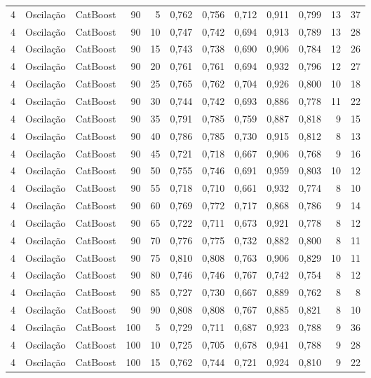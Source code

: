 \begin{longtable}{@{}rllrrrrrrrrr@{}}
4 & Oscilação & CatBoost & 90 & 5 & 0,762 & 0,756 & 0,712 & 0,911 & 0,799 & 13 & 37 \\
4 & Oscilação & CatBoost & 90 & 10 & 0,747 & 0,742 & 0,694 & 0,913 & 0,789 & 13 & 28 \\
4 & Oscilação & CatBoost & 90 & 15 & 0,743 & 0,738 & 0,690 & 0,906 & 0,784 & 12 & 26 \\
4 & Oscilação & CatBoost & 90 & 20 & 0,761 & 0,761 & 0,694 & 0,932 & 0,796 & 12 & 27 \\
4 & Oscilação & CatBoost & 90 & 25 & 0,765 & 0,762 & 0,704 & 0,926 & 0,800 & 10 & 18 \\
4 & Oscilação & CatBoost & 90 & 30 & 0,744 & 0,742 & 0,693 & 0,886 & 0,778 & 11 & 22 \\
4 & Oscilação & CatBoost & 90 & 35 & 0,791 & 0,785 & 0,759 & 0,887 & 0,818 & 9 & 15 \\
4 & Oscilação & CatBoost & 90 & 40 & 0,786 & 0,785 & 0,730 & 0,915 & 0,812 & 8 & 13 \\
4 & Oscilação & CatBoost & 90 & 45 & 0,721 & 0,718 & 0,667 & 0,906 & 0,768 & 9 & 16 \\
4 & Oscilação & CatBoost & 90 & 50 & 0,755 & 0,746 & 0,691 & 0,959 & 0,803 & 10 & 12 \\
4 & Oscilação & CatBoost & 90 & 55 & 0,718 & 0,710 & 0,661 & 0,932 & 0,774 & 8 & 10 \\
4 & Oscilação & CatBoost & 90 & 60 & 0,769 & 0,772 & 0,717 & 0,868 & 0,786 & 9 & 14 \\
4 & Oscilação & CatBoost & 90 & 65 & 0,722 & 0,711 & 0,673 & 0,921 & 0,778 & 8 & 12 \\
4 & Oscilação & CatBoost & 90 & 70 & 0,776 & 0,775 & 0,732 & 0,882 & 0,800 & 8 & 11 \\
4 & Oscilação & CatBoost & 90 & 75 & 0,810 & 0,808 & 0,763 & 0,906 & 0,829 & 10 & 11 \\
4 & Oscilação & CatBoost & 90 & 80 & 0,746 & 0,746 & 0,767 & 0,742 & 0,754 & 8 & 12 \\
4 & Oscilação & CatBoost & 90 & 85 & 0,727 & 0,730 & 0,667 & 0,889 & 0,762 & 8 & 8 \\
4 & Oscilação & CatBoost & 90 & 90 & 0,808 & 0,808 & 0,767 & 0,885 & 0,821 & 8 & 10 \\
4 & Oscilação & CatBoost & 100 & 5 & 0,729 & 0,711 & 0,687 & 0,923 & 0,788 & 9 & 36 \\
4 & Oscilação & CatBoost & 100 & 10 & 0,725 & 0,705 & 0,678 & 0,941 & 0,788 & 9 & 28 \\
4 & Oscilação & CatBoost & 100 & 15 & 0,762 & 0,744 & 0,721 & 0,924 & 0,810 & 9 & 22 \\

\end{longtable}
